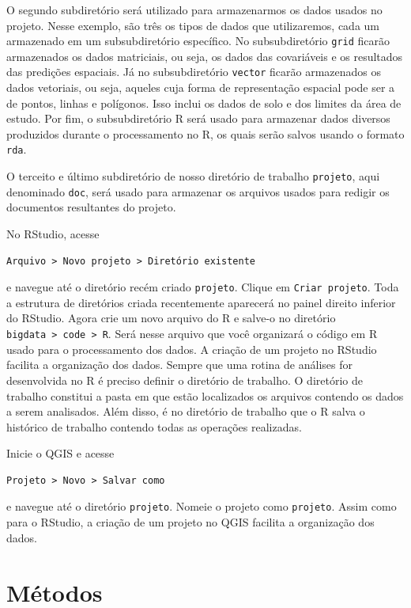 \documentclass[]{book}
\begin{document}
O segundo subdiretório será utilizado para armazenarmos os dados usados
no projeto. Nesse exemplo, são três os tipos de dados que utilizaremos,
cada um armazenado em um subsubdiretório específico. No subsubdiretório
\texttt{grid} ficarão armazenados os dados matriciais, ou seja, os dados
das covariáveis e os resultados das predições espaciais. Já no
subsubdiretório \texttt{vector} ficarão armazenados os dados vetoriais,
ou seja, aqueles cuja forma de representação espacial pode ser a de
pontos, linhas e polígonos. Isso inclui os dados de solo e dos limites
da área de estudo. Por fim, o subsubdiretório R será usado para
armazenar dados diversos produzidos durante o processamento no R, os
quais serão salvos usando o formato \texttt{rda}.

O terceito e último subdiretório de nosso diretório de trabalho
\texttt{projeto}, aqui denominado \texttt{doc}, será usado para
armazenar os arquivos usados para redigir os documentos resultantes do
projeto.

No RStudio, acesse

\begin{verbatim}
Arquivo > Novo projeto > Diretório existente
\end{verbatim}

e navegue até o diretório recém criado \texttt{projeto}. Clique em
\texttt{Criar\ projeto}. Toda a estrutura de diretórios criada
recentemente aparecerá no painel direito inferior do RStudio. Agora crie
um novo arquivo do R e salve-o no diretório
\texttt{bigdata\ \textgreater{}\ code\ \textgreater{}\ R}. Será nesse
arquivo que você organizará o código em R usado para o processamento dos
dados. A criação de um projeto no RStudio facilita a organização dos
dados. Sempre que uma rotina de análises for desenvolvida no R é preciso
definir o diretório de trabalho. O diretório de trabalho constitui a
pasta em que estão localizados os arquivos contendo os dados a serem
analisados. Além disso, é no diretório de trabalho que o R salva o
histórico de trabalho contendo todas as operações realizadas.

Inicie o QGIS e acesse

\begin{verbatim}
Projeto > Novo > Salvar como
\end{verbatim}

e navegue até o diretório \texttt{projeto}. Nomeie o projeto como
\texttt{projeto}. Assim como para o RStudio, a criação de um projeto no
QGIS facilita a organização dos dados.

\chapter{Métodos}\label{metodos}
\end{document}
